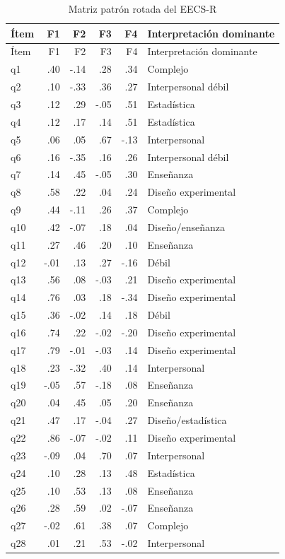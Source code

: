 \documentclass[11pt,letterpaper]{article}
\begin{document}
\begin{longtable}{lrrrrl}
\caption{Matriz patrón rotada del EECS-R}\label{tab:cargas}\\
\toprule
Ítem & F1 & F2 & F3 & F4 & Interpretación dominante\\
\midrule
\endfirsthead
\toprule
Ítem & F1 & F2 & F3 & F4 & Interpretación dominante\\
\midrule
\endhead
q1  & .40 & -.14 & .28 & .34 & Complejo\\
q2  & .10 & -.33 & .36 & .27 & Interpersonal débil\\
q3  & .12 & .29 & -.05 & .51 & Estadística\\
q4  & .12 & .17 & .14 & .51 & Estadística\\
q5  & .06 & .05 & .67 & -.13 & Interpersonal\\
q6  & .16 & -.35 & .16 & .26 & Interpersonal débil\\
q7  & .14 & .45 & -.05 & .30 & Enseñanza\\
q8  & .58 & .22 & .04 & .24 & Diseño experimental\\
q9  & .44 & -.11 & .26 & .37 & Complejo\\
q10 & .42 & -.07 & .18 & .04 & Diseño/enseñanza\\
q11 & .27 & .46 & .20 & .10 & Enseñanza\\
q12 & -.01 & .13 & .27 & -.16 & Débil\\
q13 & .56 & .08 & -.03 & .21 & Diseño experimental\\
q14 & .76 & .03 & .18 & -.34 & Diseño experimental\\
q15 & .36 & -.02 & .14 & .18 & Débil\\
q16 & .74 & .22 & -.02 & -.20 & Diseño experimental\\
q17 & .79 & -.01 & -.03 & .14 & Diseño experimental\\
q18 & .23 & -.32 & .40 & .14 & Interpersonal\\
q19 & -.05 & .57 & -.18 & .08 & Enseñanza\\
q20 & .04 & .45 & .05 & .20 & Enseñanza\\
q21 & .47 & .17 & -.04 & .27 & Diseño/estadística\\
q22 & .86 & -.07 & -.02 & .11 & Diseño experimental\\
q23 & -.09 & .04 & .70 & .07 & Interpersonal\\
q24 & .10 & .28 & .13 & .48 & Estadística\\
q25 & .10 & .53 & .13 & .08 & Enseñanza\\
q26 & .28 & .59 & .02 & -.07 & Enseñanza\\
q27 & -.02 & .61 & .38 & .07 & Complejo\\
q28 & .01 & .21 & .53 & -.02 & Interpersonal\\
\bottomrule
\end{longtable}
\end{document}
